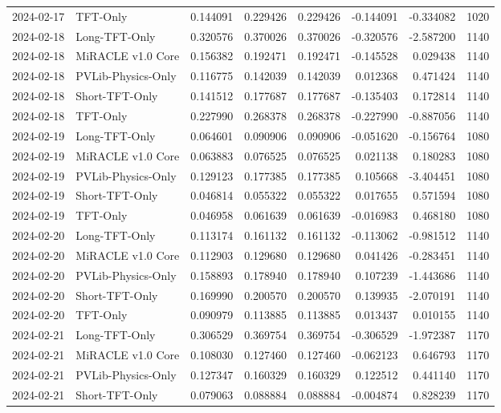 \begin{tabular}{llrrrrrr}
2024-02-17 & TFT-Only & 0.144091 & 0.229426 & 0.229426 & -0.144091 & -0.334082 & 1020 \\
2024-02-18 & Long-TFT-Only & 0.320576 & 0.370026 & 0.370026 & -0.320576 & -2.587200 & 1140 \\
2024-02-18 & MiRACLE v1.0 Core & 0.156382 & 0.192471 & 0.192471 & -0.145528 & 0.029438 & 1140 \\
2024-02-18 & PVLib-Physics-Only & 0.116775 & 0.142039 & 0.142039 & 0.012368 & 0.471424 & 1140 \\
2024-02-18 & Short-TFT-Only & 0.141512 & 0.177687 & 0.177687 & -0.135403 & 0.172814 & 1140 \\
2024-02-18 & TFT-Only & 0.227990 & 0.268378 & 0.268378 & -0.227990 & -0.887056 & 1140 \\
2024-02-19 & Long-TFT-Only & 0.064601 & 0.090906 & 0.090906 & -0.051620 & -0.156764 & 1080 \\
2024-02-19 & MiRACLE v1.0 Core & 0.063883 & 0.076525 & 0.076525 & 0.021138 & 0.180283 & 1080 \\
2024-02-19 & PVLib-Physics-Only & 0.129123 & 0.177385 & 0.177385 & 0.105668 & -3.404451 & 1080 \\
2024-02-19 & Short-TFT-Only & 0.046814 & 0.055322 & 0.055322 & 0.017655 & 0.571594 & 1080 \\
2024-02-19 & TFT-Only & 0.046958 & 0.061639 & 0.061639 & -0.016983 & 0.468180 & 1080 \\
2024-02-20 & Long-TFT-Only & 0.113174 & 0.161132 & 0.161132 & -0.113062 & -0.981512 & 1140 \\
2024-02-20 & MiRACLE v1.0 Core & 0.112903 & 0.129680 & 0.129680 & 0.041426 & -0.283451 & 1140 \\
2024-02-20 & PVLib-Physics-Only & 0.158893 & 0.178940 & 0.178940 & 0.107239 & -1.443686 & 1140 \\
2024-02-20 & Short-TFT-Only & 0.169990 & 0.200570 & 0.200570 & 0.139935 & -2.070191 & 1140 \\
2024-02-20 & TFT-Only & 0.090979 & 0.113885 & 0.113885 & 0.013437 & 0.010155 & 1140 \\
2024-02-21 & Long-TFT-Only & 0.306529 & 0.369754 & 0.369754 & -0.306529 & -1.972387 & 1170 \\
2024-02-21 & MiRACLE v1.0 Core & 0.108030 & 0.127460 & 0.127460 & -0.062123 & 0.646793 & 1170 \\
2024-02-21 & PVLib-Physics-Only & 0.127347 & 0.160329 & 0.160329 & 0.122512 & 0.441140 & 1170 \\
2024-02-21 & Short-TFT-Only & 0.079063 & 0.088884 & 0.088884 & -0.004874 & 0.828239 & 1170 \\

\end{tabular}
